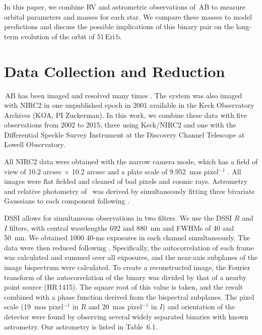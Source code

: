 In this paper, we combine RV and astrometric observations of \thisstarsix\,AB 
to measure orbital parameters and masses for each star. 
We compare these masses to model predictions and
discuss the possible implications of this binary pair on the long-term evolution of
the orbit of 51\,Eri\,b.


\section{Data Collection and Reduction}
\label{sec:data}

\thisstarsix\,AB has been imaged and resolved many times
\citep{Kasper07, Bergfors10, Delorme12, Janson12, Janson14a}. 
The system was also imaged with NIRC2 \citep{Wizinowich00} in one unpublished epoch
in 2001 available in the Keck Observatory Archives (KOA, PI Zuckerman). 
In this work, we combine these data with five observations from 2002 to 2015, three
using Keck/NIRC2 and one with the Differential Speckle Survey Instrument \citep[DSSI,][]{Horch09} at 
the Discovery Channel Telescope at Lowell Observatory.

All NIRC2 data were obtained with the narrow camera mode, which has a field of view 
of 10.2 arcsec $\times$ 10.2 arcsec and a plate scale of 9.952~mas pixel$^{-1}$
\citep{Yelda10}.  All images were flat fielded and cleaned of bad pixels and 
cosmic rays.  Astrometry and relative photometry of \thisstarsix\ was derived by 
simultaneously fitting three bivariate Gaussians to each component following 
\citet{Liu10}. 

DSSI allows for simultaneous observations in two filters.
We use the DSSI $R$ and $I$ filters, with central wavelengths
692 and 880~nm and FWHMs of 40 and 50~nm. 
We obtained 1000 40-ms exposures in each channel simultaneously.
The data were then reduced following \citet{Horch15}.
Specifically, the autocorrelation of each frame was calculated and summed over all
exposures, and the near-axis subplanes of the image bispectrum were 
calculated. 
To create a reconstructed image, the Fourier transform of the autocorrelation
of the binary was divided by that of a nearby point source (HR\,1415).
The square root of this value is taken, and the result combined with a phase function
derived from the bispectral subplanes.
The pixel scale (19~mas pixel$^{-1}$ in $R$ and 20~mas pixel$^{-1}$ in $I$) and orientation of the detector were found by observing
several widely separated binaries with known astrometry.
Our astrometry is listed in Table~6.1.


